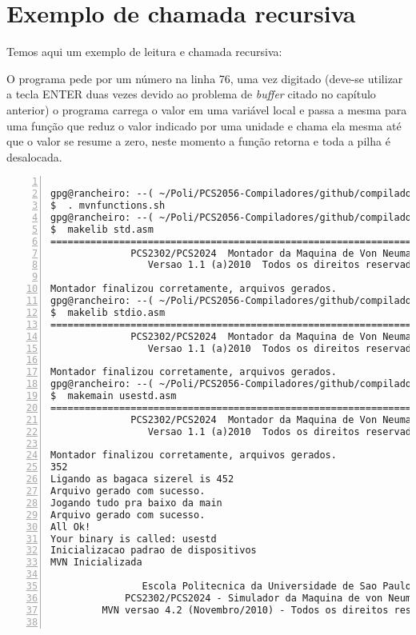 \section{Exemplo de chamada recursiva}

Temos aqui um exemplo de leitura e chamada recursiva:

O programa pede por um número na linha 76, uma vez digitado (deve-se utilizar a
    tecla ENTER duas vezes devido ao problema de \emph{buffer} citado no
    capítulo anterior) o programa carrega o valor em uma variável local e passa
a mesma para uma função que reduz o valor indicado por uma unidade e chama ela
mesma até que o valor se resume a zero, neste momento a função retorna e toda a
pilha é desalocada. 



\begin{lstlisting}[basicstyle=\footnotesize,numbers=left,breaklines=true,morekeywords={}]

gpg@rancheiro: --( ~/Poli/PCS2056-Compiladores/github/compiladores/MVN )
$  . mvnfunctions.sh 
gpg@rancheiro: --( ~/Poli/PCS2056-Compiladores/github/compiladores/MVN )
$  makelib std.asm 
===============================================================================
              PCS2302/PCS2024  Montador da Maquina de Von Neumann
                 Versao 1.1 (a)2010  Todos os direitos reservados

Montador finalizou corretamente, arquivos gerados.
gpg@rancheiro: --( ~/Poli/PCS2056-Compiladores/github/compiladores/MVN )
$  makelib stdio.asm 
===============================================================================
              PCS2302/PCS2024  Montador da Maquina de Von Neumann
                 Versao 1.1 (a)2010  Todos os direitos reservados

Montador finalizou corretamente, arquivos gerados.
gpg@rancheiro: --( ~/Poli/PCS2056-Compiladores/github/compiladores/MVN )
$  makemain usestd.asm
===============================================================================
              PCS2302/PCS2024  Montador da Maquina de Von Neumann
                 Versao 1.1 (a)2010  Todos os direitos reservados

Montador finalizou corretamente, arquivos gerados.
352
Ligando as bagaca sizerel is 452
Arquivo gerado com sucesso.
Jogando tudo pra baixo da main
Arquivo gerado com sucesso.
All Ok!
Your binary is called: usestd
Inicializacao padrao de dispositivos
MVN Inicializada

                Escola Politecnica da Universidade de Sao Paulo
             PCS2302/PCS2024 - Simulador da Maquina de von Neumann
         MVN versao 4.2 (Novembro/2010) - Todos os direitos reservados


\end{lstlisting}

